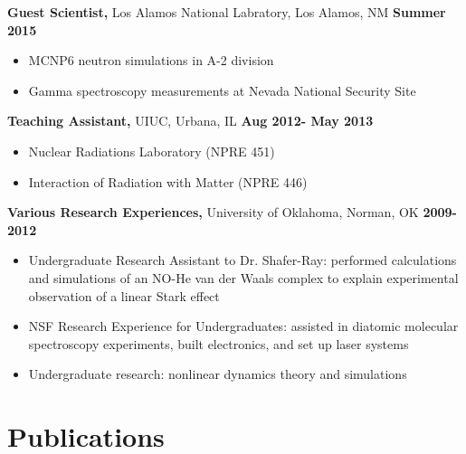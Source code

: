 \documentclass[margin]{res}
\begin{document}
\begin{resume}
 
 {\bf Guest Scientist,} Los Alamos National Labratory, Los Alamos, NM \hfill \textbf{Summer 2015}
 \begin{itemize} \itemsep -3pt  %
 \item MCNP6 neutron simulations in A-2 division
 \item Gamma spectroscopy measurements at Nevada National Security Site
 \end{itemize} 
 
\vspace{-.05in}
 
   {\bf Teaching Assistant,} UIUC, Urbana, IL \hfill \textbf{Aug 2012- May 2013}
 \begin{itemize} \itemsep -3pt  %
 \item Nuclear Radiations Laboratory (NPRE 451)
 \item Interaction of Radiation with Matter (NPRE 446)
 \end{itemize}

\vspace{-.05in}
 
 {\bf Various Research Experiences,} University of Oklahoma, Norman, OK \hfill  \textbf{2009-2012}
\begin{itemize} \itemsep -3pt %
\item Undergraduate Research Assistant to Dr. Shafer-Ray: performed calculations and simulations of an NO-He van der Waals complex to explain experimental observation of a linear Stark effect
\item NSF Research Experience for Undergraduates: assisted in diatomic molecular spectroscopy experiments, built electronics, and set up laser systems
\item Undergraduate research: nonlinear dynamics theory and simulations
\end{itemize}

\vspace{-.05in}



\section{Publications}
%


\end{resume}
\end{document}
